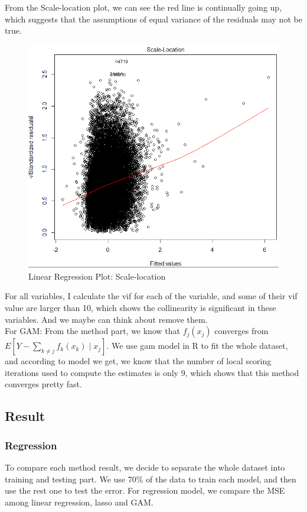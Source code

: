 \documentclass[11pt]{article}
\begin{document}
    From the Scale-location plot, we can see the red line is continually going up, which suggests that the assumptions of equal variance of the residuals may not be true.  \\
    
    \begin{figure}[h]
        \centering
        \includegraphics[width=0.7\linewidth]{linear_sl.png}
        \caption{Linear Regression Plot: Scale-location}
    \end{figure}
    
    For all variables, I calculate the vif for each of the variable, and some of their vif value are larger than 10, which shows the collinearity is significant in these variables. And we maybe can think about remove them. \\ 
    
For GAM: From the method part, we know that $f_j(x_j)$ converges from $E \left[Y-\sum_{k \neq j}f_k(x_k)\mid{x_j} \right]$. We use gam model in R to fit the whole dataset, and according to model we get, we know that the number of local scoring iterations used to compute the estimates is only 9, which shows that this method converges pretty fast.
\subsection{Result}
\subsubsection{Regression}
To compare each method result, we decide to separate the whole dataset into training and testing part. We use 70\% of the data to train each model, and then use the rest one to test the error. For regression model, we compare the MSE among linear regression, lasso and GAM. \\
\end{document}
